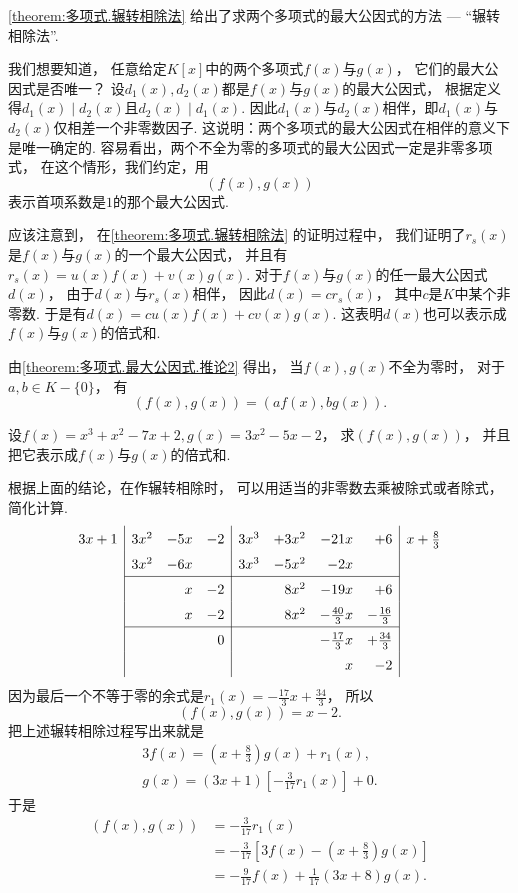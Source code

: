 \cref{theorem:多项式.辗转相除法} 给出了求两个多项式的最大公因式的方法 --- “辗转相除法”.

我们想要知道，
任意给定\(K[x]\)中的两个多项式\(f(x)\)与\(g(x)\)，
它们的最大公因式是否唯一？
设\(d_1(x),d_2(x)\)都是\(f(x)\)与\(g(x)\)的最大公因式，
根据定义得\(d_1(x) \mid d_2(x)\)且\(d_2(x) \mid d_1(x)\).
因此\(d_1(x)\)与\(d_2(x)\)相伴，即\(d_1(x)\)与\(d_2(x)\)仅相差一个非零数因子.
这说明：两个多项式的最大公因式在相伴的意义下是唯一确定的.
容易看出，两个不全为零的多项式的最大公因式一定是非零多项式，
在这个情形，我们约定，用\[
	(f(x), g(x))
\]表示首项系数是\(1\)的那个最大公因式.

应该注意到，
在\cref{theorem:多项式.辗转相除法} 的证明过程中，
我们证明了\(r_s(x)\)是\(f(x)\)与\(g(x)\)的一个最大公因式，
并且有\(r_s(x) = u(x) f(x) + v(x) g(x)\).
对于\(f(x)\)与\(g(x)\)的任一最大公因式\(d(x)\)，
由于\(d(x)\)与\(r_s(x)\)相伴，
因此\(d(x) = c r_s(x)\)，
其中\(c\)是\(K\)中某个非零数.
于是有\(d(x) = c u(x) f(x) + c v(x) g(x)\).
这表明\(d(x)\)也可以表示成\(f(x)\)与\(g(x)\)的倍式和.

由\cref{theorem:多项式.最大公因式.推论2} 得出，
当\(f(x),g(x)\)不全为零时，
对于\(a,b \in K-\{0\}\)，
有\[
	(f(x),g(x))
	= (a f(x),b g(x)).
\]

\begin{example}
设\(f(x)=x^3+x^2-7x+2,
g(x)=3x^2-5x-2\)，
求\((f(x),g(x))\)，
并且把它表示成\(f(x)\)与\(g(x)\)的倍式和.
\begin{solution}
根据上面的结论，在作辗转相除时，
可以用适当的非零数去乘被除式或者除式，简化计算.
\[
	\def\arraystretch{1.5}
	\begin{array}{r|*3r|*4r|l}
		3x+1 & 3x^2 & -5x & -2 & 3x^3 & +3x^2 & -21x & +6 & x+\frac83 \\
		& 3x^2 & -6x && 3x^3 & -5x^2 & -2x & \\ \cline{2-8}
		&& x & -2 && 8x^2 & -19x & +6 \\
		&& x & -2 && 8x^2 & -\frac{40}3x & -\frac{16}3 \\ \cline{2-8}
		&&& 0 &&& -\frac{17}3x & +\frac{34}3 \\
		&&& &&& x & -2 \\
	\end{array}
\]
因为最后一个不等于零的余式是\(r_1(x) = -\frac{17}3x + \frac{34}3\)，
所以\[
	(f(x),g(x)) = x-2.
\]
把上述辗转相除过程写出来就是\begin{align*}
	3 f(x) = \left(x+\frac83\right) g(x) + r_1(x), \\
	g(x) = (3x+1) \left[-\frac3{17} r_1(x)\right] + 0.
\end{align*}
于是\begin{align*}
	(f(x),g(x))
	&= -\frac3{17} r_1(x) \\
	&= -\frac3{17} \left[3 f(x) - \left(x+\frac83\right) g(x)\right] \\
	&= -\frac9{17} f(x) + \frac1{17} (3x+8) g(x).
\end{align*}
\end{solution}
\end{example}

